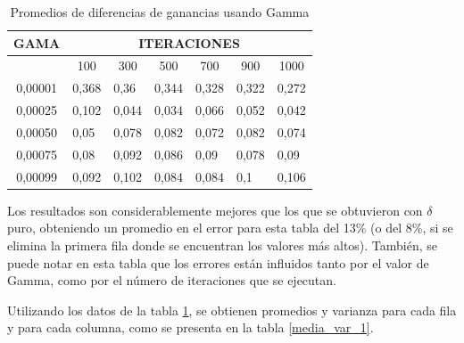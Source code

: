 \begin{table}[H]
\centering
\caption{Promedios de diferencias de ganancias usando Gamma}
\begin{tabular}{cllllll}
GAMA                 & \multicolumn{6}{c}{ITERACIONES}    \\ \hline
\multicolumn{1}{l}{} & \multicolumn{1}{c}{100} & \multicolumn{1}{c}{300} & \multicolumn{1}{c}{500} & \multicolumn{1}{c}{700} & \multicolumn{1}{c}{900} & \multicolumn{1}{c}{1000} \\ \hline
0,00001              & 0,368                   & 0,36                    & 0,344                   & 0,328                   & 0,322                   & 0,272                    \\
0,00025              & 0,102                   & 0,044                   & 0,034                   & 0,066                   & 0,052                   & 0,042                    \\
0,00050              & 0,05                    & 0,078                   & 0,082                   & 0,072                   & 0,082                   & 0,074                    \\
0,00075              & 0,08                    & 0,092                   & 0,086                   & 0,09                    & 0,078                   & 0,09                     \\
0,00099              & 0,092                   & 0,102                   & 0,084                   & 0,084                   & 0,1                     & 0,106         \\ \hline
\end{tabular}
\label{experimento1}
\end{table}

Los resultados son considerablemente mejores que los que se obtuvieron con $\delta$ puro, obteniendo un promedio en el error para esta tabla del 13\% (o del 8\%, si se elimina la primera fila donde se encuentran los valores más altos). También, se puede notar en esta tabla que los errores están influidos tanto por el valor de Gamma, como por el número de iteraciones que se ejecutan.

Utilizando los datos de la tabla \ref{experimento1}, se obtienen promedios y varianza para cada fila y para cada columna, como se presenta en la tabla \ref{media_var_1}.

